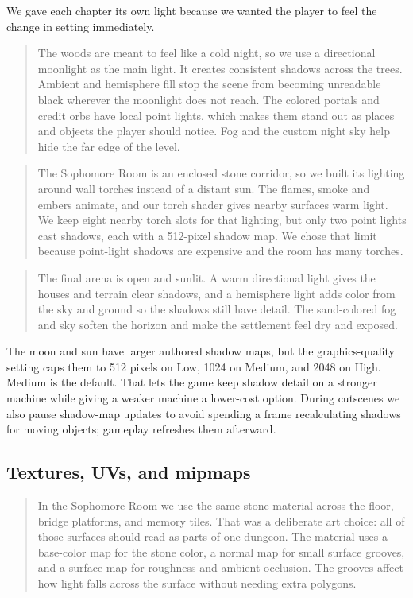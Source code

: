 \documentclass[11pt,a4paper]{article}
\newcommand{\say}[1]{\begin{quote}\small\color{ink}#1\end{quote}}
\begin{document}
We gave each chapter its own light because we wanted the player to feel the change in setting immediately.

\say{The woods are meant to feel like a cold night, so we use a directional moonlight as the main light. It creates consistent shadows across the trees. Ambient and hemisphere fill stop the scene from becoming unreadable black wherever the moonlight does not reach. The colored portals and credit orbs have local point lights, which makes them stand out as places and objects the player should notice. Fog and the custom night sky help hide the far edge of the level.}

\say{The Sophomore Room is an enclosed stone corridor, so we built its lighting around wall torches instead of a distant sun. The flames, smoke and embers animate, and our torch shader gives nearby surfaces warm light. We keep eight nearby torch slots for that lighting, but only two point lights cast shadows, each with a 512-pixel shadow map. We chose that limit because point-light shadows are expensive and the room has many torches.}

\say{The final arena is open and sunlit. A warm directional light gives the houses and terrain clear shadows, and a hemisphere light adds color from the sky and ground so the shadows still have detail. The sand-colored fog and sky soften the horizon and make the settlement feel dry and exposed.}

The moon and sun have larger authored shadow maps, but the graphics-quality setting caps them to 512 pixels on Low, 1024 on Medium, and 2048 on High. Medium is the default. That lets the game keep shadow detail on a stronger machine while giving a weaker machine a lower-cost option. During cutscenes we also pause shadow-map updates to avoid spending a frame recalculating shadows for moving objects; gameplay refreshes them afterward.

\subsection{Textures, UVs, and mipmaps}

\say{In the Sophomore Room we use the same stone material across the floor, bridge platforms, and memory tiles. That was a deliberate art choice: all of those surfaces should read as parts of one dungeon. The material uses a base-color map for the stone color, a normal map for small surface grooves, and a surface map for roughness and ambient occlusion. The grooves affect how light falls across the surface without needing extra polygons.}
\end{document}
